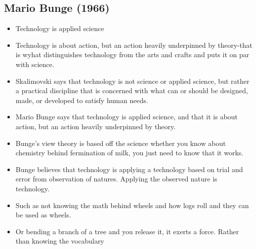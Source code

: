 \documentclass{article}
\begin{document}
\subsection{Mario Bunge (1966)}
\begin{itemize}
  \item Technology is applied science
  \item Technology is about action, but an action heavily
    underpinned by theory-that
    is wyhat distinguishes technology from the arts and crafts and puts
    it on par with science.
  \item Skalimovski says that technology is not science or applied science,
    but rather a practical discipline that is concerned with what can or should be
    designed, made, or developed to satisfy human needs.
  \item Mario Bunge says that technology is applied science,
    and that it is about action, but an action heavily underpinned by theory.
  \item Bunge's view theory is based off the science whether
    you know about chemistry behind fermination of milk,
    you just need to know that it works.
  \item Bunge believes that technology is applying a technology
    based on trial and error from observation of natures.
    Applying the observed nature is technology.
  \item Such as not knowing the math behind wheels and
    how logs roll and they can be used as wheels.
  \item Or bending a branch of a tree and you release it,
    it exerts a force. Rather than knowing the vocabulary

\end{itemize}
\end{document}
